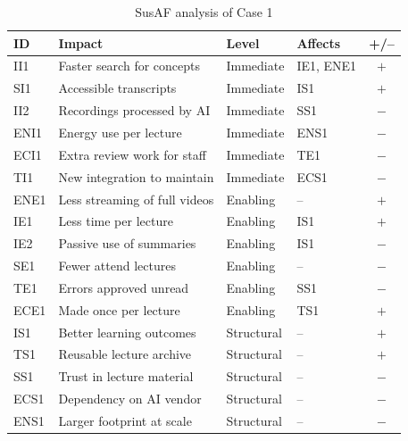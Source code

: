 \begin{table}[H]
    \centering
    \small
    \begin{tabularx}{\textwidth}{|l|X|l|l|c|}
        \hline
        \textbf{ID} & \textbf{Impact} & \textbf{Level} & \textbf{Affects} & \textbf{+/--} \\ \hline
        II1 & Faster search for concepts & Immediate & IE1, ENE1 & $+$ \\ \hline
        SI1 & Accessible transcripts & Immediate & IS1 & $+$ \\ \hline
        II2 & Recordings processed by AI & Immediate & SS1 & $-$ \\ \hline
        ENI1 & Energy use per lecture & Immediate & ENS1 & $-$ \\ \hline
        ECI1 & Extra review work for staff & Immediate & TE1 & $-$ \\ \hline
        TI1 & New integration to maintain & Immediate & ECS1 & $-$ \\ \hline
        ENE1 & Less streaming of full videos & Enabling & -- & $+$ \\ \hline
        IE1 & Less time per lecture & Enabling & IS1 & $+$ \\ \hline
        IE2 & Passive use of summaries & Enabling & IS1 & $-$ \\ \hline
        SE1 & Fewer attend lectures & Enabling & -- & $-$ \\ \hline
        TE1 & Errors approved unread & Enabling & SS1 & $-$ \\ \hline
        ECE1 & Made once per lecture & Enabling & TS1 & $+$ \\ \hline
        IS1 & Better learning outcomes & Structural & -- & $+$ \\ \hline
        TS1 & Reusable lecture archive & Structural & -- & $+$ \\ \hline
        SS1 & Trust in lecture material & Structural & -- & $-$ \\ \hline
        ECS1 & Dependency on AI vendor & Structural & -- & $-$ \\ \hline
        ENS1 & Larger footprint at scale & Structural & -- & $-$ \\ \hline
    \end{tabularx}
    \caption{SusAF analysis of Case 1}
    \label{tab:susaf-case1}
\end{table}

